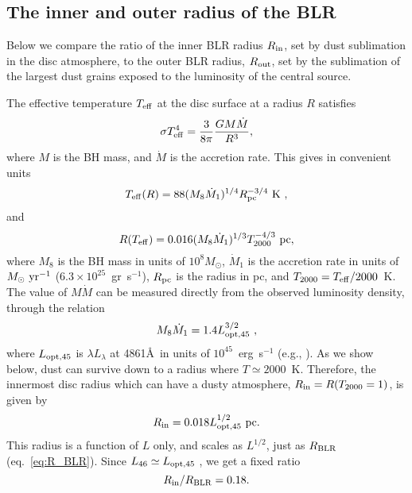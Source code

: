\documentclass[a4paper,fleqn,usenatbib]{mnras}
\newcommand{\mdot}{\dot{M}}
\begin{document}
\subsection{The inner and outer radius of the BLR}

Below we compare the ratio of the inner BLR radius $R_{\rm in}$, set by dust sublimation in the
disc atmosphere, to the outer BLR radius, $R_{\rm out}$, set by the sublimation of the largest 
dust grains exposed to the luminosity of the central source. 

The effective temperature $T_{\rm eff}$ at the disc surface at a radius $R$ satisfies
\begin{equation}
\sigma T_{\rm eff}^4 = \frac{3}{8\pi}\frac{GM\mdot}{R^3} , 
\label{eq:flux1}
\end{equation}
where $M$ is the BH mass, and $\mdot$ is the accretion rate. This gives in convenient units
\begin{equation}
T_{\rm eff}(R)=88 (M_8\mdot_1)^{1/4}R_{\rm pc}^{-3/4}~{\rm K} \ ,
\label{eq:T_R}
\end{equation}
and
\begin{equation}
R(T_{\rm eff})=0.016 (M_8\mdot_1)^{1/3}T_{2000}^{-4/3}~{\rm pc},
\label{eq:R_2000}
\end{equation}
where $M_8$ is the BH mass in units of $10^8M_{\odot}$, $\mdot_1$ is the accretion rate in units
of $M_{\odot}~{\rm yr}^{-1}$  ($6.3\times 10^{25}$~gr~s$^{-1}$), $R_{\rm pc}$ is the radius in pc,
and $T_{2000}=T_{\rm eff}/2000$~K.
The value of $M\mdot$ can be measured directly from the observed luminosity density, through the relation
\begin{equation}
M_8\mdot_1=1.4L_{\rm opt, 45}^{3/2}\ ,
\label{eq:mmdot}
\end{equation}
where $L_{\rm opt, 45}$ is $\lambda L_{\lambda}$ at 4861\AA\ in units of $10^{45}$~erg~s$^{-1}$ (e.g., \citealt{DavisLaor11}). 
As we show below, dust can survive down to a radius where $T\simeq 2000$~K. Therefore, 
the innermost disc radius which can have a dusty atmosphere, $R_{\rm in}=R(T_{2000}=1)$, 
is given by
\begin{equation}
R_{\rm in}=0.018L_{\rm opt, 45}^{1/2}~{\rm pc} .
\label{eq:Rin}
\end{equation}
This radius is a function of $L$ only, and scales as $L^{1/2}$, just as $R_{\rm BLR}$ 
(eq.~\ref{eq:R_BLR}).
Since $L_{46}\simeq L_{\rm opt, 45}$ 
\citep{Richards06}, we get a fixed ratio
\begin{equation}
R_{\rm in}/R_{\rm BLR}= 0.18.
\label{eq:RinRblr}
\end{equation}
\end{document}
